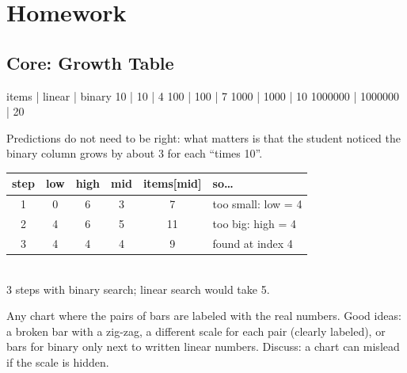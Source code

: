 \section{Homework}
\subsection{Core: Growth Table}
\begin{answer}
\begin{outputcode}
   items |  linear |  binary
      10 |      10 |       4
     100 |     100 |       7
    1000 |    1000 |      10
 1000000 | 1000000 |      20
\end{outputcode}
Predictions do not need to be right: what matters is that the student noticed the binary column grows by about 3 for each \enquote{times 10}.
\end{answer}

\begin{answer}
\begin{tabular}{@{}cccccl@{}}
\toprule
step & low & high & mid & items[mid] & so\ldots \\ \midrule
1 & 0 & 6 & 3 & 7 & too small: low = 4 \\
2 & 4 & 6 & 5 & 11 & too big: high = 4 \\
3 & 4 & 4 & 4 & 9 & found at index 4 \\
\bottomrule
\end{tabular}\\[4pt]
3 steps with binary search; linear search would take 5.
\end{answer}

\begin{answer}
Any chart where the pairs of bars are labeled with the real numbers. Good ideas: a broken bar with a zig-zag, a different scale for each pair (clearly labeled), or bars for binary only next to written linear numbers. Discuss: a chart can mislead if the scale is hidden.
\end{answer}

